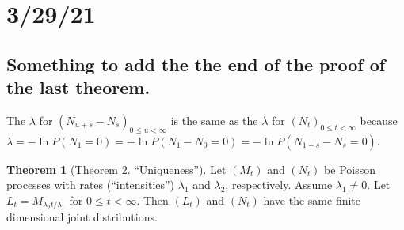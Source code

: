 \documentclass{article}
\theoremstyle{definition}
\newtheorem{theorem}{Theorem}
\begin{document}
\section*{3/29/21}

\subsection*{Something to add the the end of the proof of the last theorem.}
The $\lambda$ for $(N_{u+s} - N_s)_{0 \leq u < \infty}$ is the same as the $\lambda$ for $(N_t)_{0 \leq t < \infty}$ because $\lambda = -\ln P(N_1 = 0) = -\ln P(N_1 - N_0 = 0) = -\ln P(N_{1+s} - N_s = 0)$.

\begin{theorem}[Theorem 2. ``Uniqueness'']
Let $(M_t)$ and $(N_t)$ be Poisson processes with rates (``intensities'') $\lambda_1$ and $\lambda_2$, respectively. Assume $\lambda_1 \neq 0$. Let $L_t = M_{\lambda_2 t/\lambda_1}$ for $0 \leq t < \infty$. Then $(L_t)$ and $(N_t)$ have the same finite dimensional joint distributions.
\end{theorem}
\end{document}
